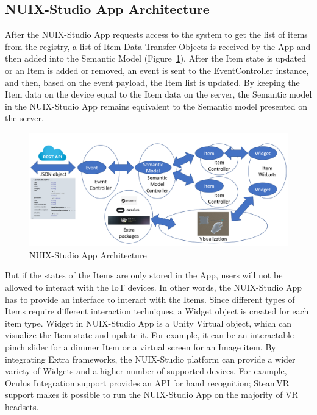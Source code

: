 \subsection{NUIX-Studio App Architecture}

After the NUIX-Studio App requests access to the system to get the list of items from the registry, a list of Item Data Transfer Objects is received by the App and then added into the Semantic Model (Figure~\ref{fig:AppArchitecture-figure}). After the Item state is updated or an Item is added or removed, an event is sent to the EventController instance, and then, based on the event payload, the Item list is updated.  By keeping the Item data on the device equal to the Item data on the server, the Semantic model in the NUIX-Studio App remains equivalent to the Semantic model presented on the server. 

\begin{figure}
  \centering
  \includegraphics[width=0.9\linewidth]{figures/AppArchitecture.png}
  \caption{NUIX-Studio App Architecture}
  \label{fig:AppArchitecture-figure}
\end{figure}

But if the states of the Items are only stored in the App, users will not be allowed to interact with the IoT devices. In other words, the NUIX-Studio App has to provide an interface to interact with the Items. Since different types of Items require different interaction techniques, a Widget object is created for each item type. Widget in NUIX-Studio App is a Unity Virtual object, which can visualize the Item state and update it. For example, it can be an interactable pinch slider for a dimmer Item or a virtual screen for an Image item. By integrating Extra frameworks, the NUIX-Studio platform can provide a wider variety of Widgets and a higher number of supported devices. For example, Oculus Integration support provides an API for hand recognition; SteamVR~\cite{SteamVR2021} support makes it possible to run the NUIX-Studio App on the majority of VR headsets.


